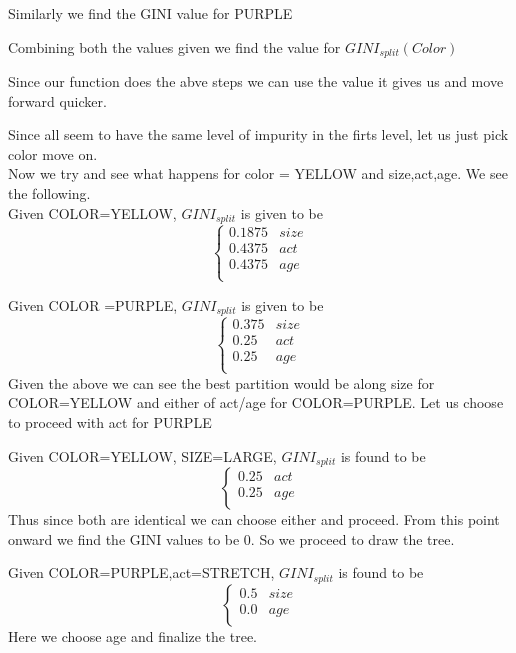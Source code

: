 \documentclass[fontsize=10pt]{scrartcl}
\begin{document}
\begin{enumerate}
			Similarly  we find the GINI value for PURPLE

			Combining both the values given we find the value for $GINI_{split} (Color)$

			Since our function does the abve steps we can use the value it gives us and move forward quicker.

			Since all seem to have the same level of impurity in the firts level, let us just pick color move on.\\
			Now we try and see what happens for color = YELLOW and size,act,age. We see the following.\\


			Given COLOR=YELLOW, $GINI_{split}$ is given to be
			\[   \left\{
                  \begin{array}{ll}
                        0.1875 & size \\
                        0.4375 & act \\
                        0.4375 & age \\
                  \end{array} 
                  \right. \]
			
			Given COLOR =PURPLE, $GINI_{split}$ is given to be
			\[   \left\{
                  \begin{array}{ll}
                        0.375 & size \\
                        0.25 & act \\
                        0.25 & age \\
                  \end{array} 
                  \right. \]
            Given the above we can see the best partition would be along size for COLOR=YELLOW and either of act/age for COLOR=PURPLE. Let us choose to proceed with act for PURPLE

            Given COLOR=YELLOW, SIZE=LARGE, $GINI_{split}$ is found to be
            \[   \left\{
                  \begin{array}{ll}
                        0.25 & act \\
                        0.25 & age \\
                  \end{array} 
                  \right. \]
            Thus since both are identical we can choose either and proceed. From this point onward we find the GINI values to be 0. So we proceed to draw the tree.

            Given COLOR=PURPLE,act=STRETCH, $GINI_{split}$ is found to be
             \[   \left\{
                  \begin{array}{ll}
                        0.5 & size \\
                        0.0 & age \\
                  \end{array} 
                  \right. \]
            Here we choose age and finalize the tree. 


\end{enumerate}
\end{document}
